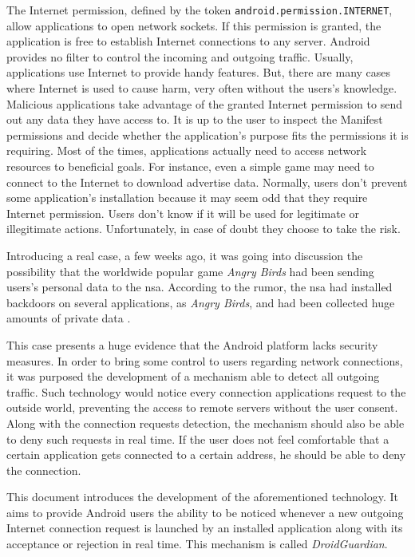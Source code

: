 The Internet permission, defined by the token \texttt{android.permission.INTERNET}, allow applications to open network sockets. If this permission is granted, the application is free to establish Internet connections to any server. Android provides no filter to control the incoming and outgoing traffic. Usually, applications use Internet to provide handy features. But, there are many cases where Internet is used to cause harm, very often without the users's knowledge. Malicious applications take advantage of the granted Internet permission to send out any data they have access to. It is up to the user to inspect the Manifest permissions and decide whether the application's purpose fits the permissions it is requiring. Most of the times, applications actually need to access network resources to beneficial goals. For instance, even a simple game may need to connect to the Internet to download advertise data. Normally, users don't prevent some application's installation because it may seem odd that they require Internet permission. Users don't know if it will be used for legitimate or illegitimate actions. Unfortunately, in case of doubt they choose to take the risk.

Introducing a real case, a few weeks ago, it was going into discussion the possibility that the worldwide popular game \textit{Angry Birds} had been sending users's personal data to the \gls{nsa}. According to the rumor, the \gls{nsa} had installed backdoors on several applications, as \textit{Angry Birds}, and had been collected huge amounts of private data \cite{AngryBirds}.

This case presents a huge evidence that the Android platform lacks security measures. In order to bring some control to users regarding network connections, it was purposed the development of a mechanism able to detect all outgoing traffic. Such technology would notice every connection applications request to the outside world, preventing the access to remote servers without the user consent. Along with the connection requests detection, the mechanism should also be able to deny such requests in real time. If the user does not feel comfortable that a certain application gets connected to a certain address, he should be able to deny the connection.

This document introduces the development of the aforementioned technology. It aims to provide Android users the ability to be noticed whenever a new outgoing Internet connection request is launched by an installed application along with its acceptance or rejection in real time. This mechanism is called \textit{DroidGuardian}.

